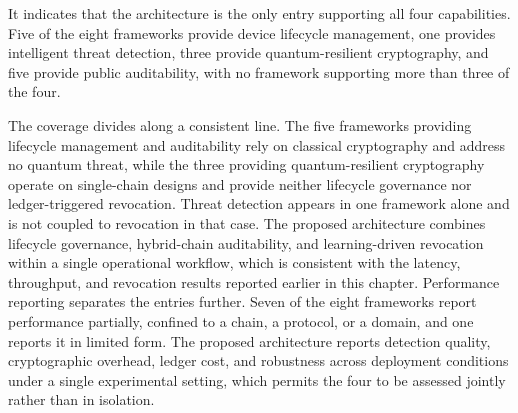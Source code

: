 It indicates that the architecture is the only entry supporting all four capabilities. Five of the eight frameworks provide device lifecycle management, one provides intelligent threat detection, three provide quantum-resilient cryptography, and five provide public auditability, with no framework supporting more than three of the four.
 
The coverage divides along a consistent line. The five frameworks providing lifecycle management and auditability rely on classical cryptography and address no quantum threat, while the three providing quantum-resilient cryptography operate on single-chain designs and provide neither lifecycle governance nor ledger-triggered revocation. Threat detection appears in one framework alone and is not coupled to revocation in that case. The proposed architecture combines lifecycle governance, hybrid-chain auditability, and learning-driven revocation within a single operational workflow, which is consistent with the latency, throughput, and revocation results reported earlier in this chapter.
Performance reporting separates the entries further. Seven of the eight frameworks report performance partially, confined to a chain, a protocol, or a domain, and one reports it in limited form. The proposed architecture reports detection quality, cryptographic overhead, ledger cost, and robustness across deployment conditions under a single experimental setting, which permits the four to be assessed jointly rather than in isolation.

